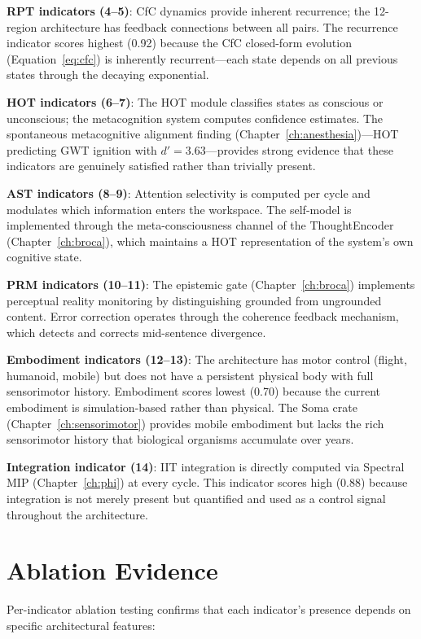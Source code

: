 \documentclass[12pt]{book}
\begin{document}
\textbf{RPT indicators (4--5)}: CfC dynamics provide inherent recurrence; the 12-region architecture has feedback connections between all pairs. The recurrence indicator scores highest (0.92) because the CfC closed-form evolution (Equation~\ref{eq:cfc}) is inherently recurrent---each state depends on all previous states through the decaying exponential.

\textbf{HOT indicators (6--7)}: The HOT module classifies states as conscious or unconscious; the metacognition system computes confidence estimates. The spontaneous metacognitive alignment finding (Chapter~\ref{ch:anesthesia})---HOT predicting GWT ignition with $d' = 3.63$---provides strong evidence that these indicators are genuinely satisfied rather than trivially present.

\textbf{AST indicators (8--9)}: Attention selectivity is computed per cycle and modulates which information enters the workspace. The self-model is implemented through the meta-consciousness channel of the ThoughtEncoder (Chapter~\ref{ch:broca}), which maintains a HOT representation of the system's own cognitive state.

\textbf{PRM indicators (10--11)}: The epistemic gate (Chapter~\ref{ch:broca}) implements perceptual reality monitoring by distinguishing grounded from ungrounded content. Error correction operates through the coherence feedback mechanism, which detects and corrects mid-sentence divergence.

\textbf{Embodiment indicators (12--13)}: The architecture has motor control (flight, humanoid, mobile) but does not have a persistent physical body with full sensorimotor history. Embodiment scores lowest (0.70) because the current embodiment is simulation-based rather than physical. The Soma crate (Chapter~\ref{ch:sensorimotor}) provides mobile embodiment but lacks the rich sensorimotor history that biological organisms accumulate over years.

\textbf{Integration indicator (14)}: IIT integration is directly computed via Spectral MIP (Chapter~\ref{ch:phi}) at every cycle. This indicator scores high (0.88) because integration is not merely present but quantified and used as a control signal throughout the architecture.

\section{Ablation Evidence}

Per-indicator ablation testing confirms that each indicator's presence depends on specific architectural features:
\end{document}
